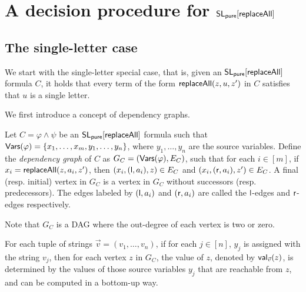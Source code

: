 


\section{A decision procedure for $\mathsf{SL_{pure}}[\mathsf{replaceAll}]$} \label{sec:replaceallpure}



\subsection{The single-letter case}

We start with the single-letter special case, that is, given an $\mathsf{SL_{pure}}[\mathsf{replaceAll}]$ formula $C$, it holds that every term of the form $\mathsf{replaceAll}(z, u, z')$ in $C$ satisfies that $u$ is a single letter.

We first introduce a concept of dependency graphs.

\begin{definition}
	Let $C= \varphi \wedge \psi$ be an $\mathsf{SL_{pure}}[\mathsf{replaceAll}]$ formula such that $\mathsf{Vars}(\varphi) = \{x_1,\dots, x_m, y_1, \dots, y_n\}$, where $y_1,\dots, y_n$ are the source variables. Define the \emph{dependency graph} of $C$ as $G_C= (\mathsf{Vars}(\varphi), E_C)$, such that for each $i \in [m]$, if $x_i = \mathsf{replaceAll}(z, a_i, z')$, then $(x_i, (\mathsf{l}, a_i), z) \in E_C$ and $(x_i, (\mathsf{r}, a_i), z') \in E_C$. A final (resp. initial) vertex in $G_C$ is a vertex in $G_C$ without successors (resp. predecessors). The edges labeled by $(\mathsf{l},a_i)$ and $(\mathsf{r}, a_i)$ are called the $\mathsf{l}$-edges and $\mathsf{r}$-edges respectively. 
\end{definition}
Note that $G_C$ is a DAG where the out-degree of each vertex is two or zero. 


For each tuple of strings $\vec{v}=(v_1,\dots, v_n)$, if for each $j \in [n]$, $y_j$ is assigned with the string $v_j$, then for each vertex $z$ in $G_C$, the value of $z$, denoted by $\mathsf{val}_{\vec{v}}(z)$, is determined by the values of those source variables $y_j$ that are reachable from $z$, and can be computed in a bottom-up way. 

